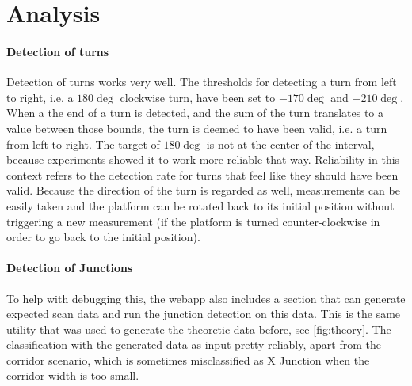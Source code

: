 \section{Analysis}
\label{sec:analysis}

\paragraph{Detection of turns}
Detection of turns works very well. The thresholds for detecting a turn from left to right, i.e. a $180\deg$ clockwise turn, have been set to $-170\deg$ and $-210\deg$.
When a the end of a turn is detected, and the sum of the turn translates to a value between those bounds, the turn is deemed to have been valid, i.e. a turn from left to right.
The target of $180\deg$ is not at the center of the interval, because experiments showed it to work more reliable that way.
Reliability in this context refers to the detection rate for turns that feel like they should have been valid.
Because the direction of the turn is regarded as well, measurements can be easily taken and the platform can be rotated back to its initial position without triggering a new measurement (if the platform is turned counter-clockwise in order to go back to the initial position).


\paragraph{Detection of Junctions}
To help with debugging this, the webapp also includes a section that can generate expected scan data and run the junction detection on this data. This is the same utility that was used to generate the theoretic data before, see \ref{fig:theory}.
The classification with the generated data as input pretty reliably, apart from the corridor scenario, which is sometimes misclassified as X Junction when the corridor width is too small.